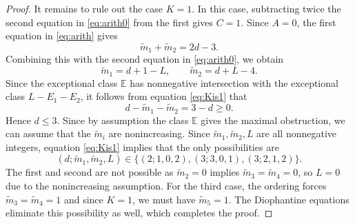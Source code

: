 \documentclass[11pt, reqno]{amsart}
\theoremstyle{remark}
\numberwithin{equation}{subsection}
\numberwithin{figure}{section}
\theoremstyle{customremark}
\newcommand{\bE}{{\mathbb E}}
\newcommand{\comm}[1]{\marginpar{\tiny #1 }}
\begin{document}
\begin{proof}
 
    It remains to rule out the case $K=1$. In this case, subtracting twice the second
equation in \eqref{eq:arith0} from the first gives $C=1$. Since $A=0$, the first
equation in \eqref{eq:arith} gives
\[
        \widetilde m_1+\widetilde m_2=2d-3.
\]
Combining this with the second equation in \eqref{eq:arith0}, we obtain
\begin{equation} \label{eq:Kis1}
    \widetilde m_1=d+1-L,\qquad
        \widetilde m_2=d+L-4.
\end{equation}
%
Since the exceptional class $\bE$ has nonnegative intersection with the exceptional class $L-E_1-E_2$, it follows from equation \eqref{eq:Kis1} that
\[
        d-\widetilde m_1-\widetilde m_2=3-d\geq0.
\]
Hence $d\leq3$.
Since by assumption the class $\bE$ gives the maximal obstruction, we can assume that the $\widetilde m_i$ are nonincreasing. 
 Since $\widetilde m_1,\widetilde m_2,L$ are all nonnegative integers, equation \eqref{eq:Kis1} implies that the only possibilities are
\[ (d;\widetilde m_1, \widetilde m_2,L)\in \{(2;1,0,2),(3;3,0,1),(3;2,1,2)\}.\]
The first and second are not possible as $\widetilde{m}_2=0$ implies $\widetilde{m}_3=\widetilde{m}_4=0$, so $L=0$ due to the nonincreasing assumption. For the third case, the ordering forces $\widetilde{m}_3=\widetilde{m}_4=1$ and since $K=1$, we must have $\widetilde{m}_5=1.$ The Diophantine equations eliminate this possibility as well, which completes the proof.
   \end{proof}
\end{document}
